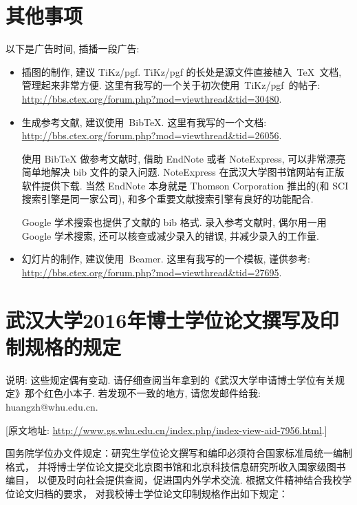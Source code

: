 \documentclass{ice_report}  %
\begin{document}
\chapter{其他事项}
以下是广告时间, 插播一段广告:
\begin{itemize}
    \item 插图的制作, 建议 TiKz/pgf.
          TiKz/pgf 的长处是源文件直接植入~\TeX~文档, 管理起来非常方便.
    这里有我写的一个关于初次使用~TiKz/pgf~的帖子:\\    \url{http://bbs.ctex.org/forum.php?mod=viewthread&tid=30480}.
    \item 生成参考文献, 建议使用~BibTeX.  这里有我写的一个文档: \\
    \url{http://bbs.ctex.org/forum.php?mod=viewthread&tid=26056}.

      {\kaishu 使用 BibTeX{} 做参考文献时,
      借助 EndNote 或者 NoteExpress, 可以非常漂亮简单地解决 bib 文件的录入问题.
      NoteExpress 在武汉大学图书馆网站有正版软件提供下载.
      当然 EndNote 本身就是 Thomson Corporation 推出的(和 SCI 搜索引擎是同一家公司),
      和多个重要文献搜索引擎有良好的功能配合.

      Google 学术搜索也提供了文献的 bib 格式.
      录入参考文献时, 偶尔用一用 Google 学术搜索, 还可以核查或减少录入的错误, 并减少录入的工作量.}
     \item 幻灯片的制作, 建议使用~Beamer. 这里有我写的一个模板, 谨供参考:\\
    \url{http://bbs.ctex.org/forum.php?mod=viewthread&tid=27695}.

\end{itemize}

\chapter{武汉大学2016年博士学位论文撰写及印制规格的规定}


{ {\heiti 说明}: \kaishu
 这些规定偶有变动.
 请仔细查阅当年拿到的《武汉大学申请博士学位有关规定》那个红色小本子.
 若发现不一致的地方, 请您发邮件给我: huangzh@whu.edu.cn.}

\bigskip


[原文地址: \url{http://www.gs.whu.edu.cn/index.php/index-view-aid-7956.html}.]
\bigskip

国务院学位办文件规定：研究生学位论文撰写和编印必须符合国家标准局统一编制格式，
并将博士学位论文提交北京图书馆和北京科技信息研究所收入国家级图书编目，
以便及时向社会提供查阅，促进国内外学术交流. 根据文件精神结合我校学位论文归档的要求，
对我校博士学位论文印制规格作出如下规定：
\end{document}
